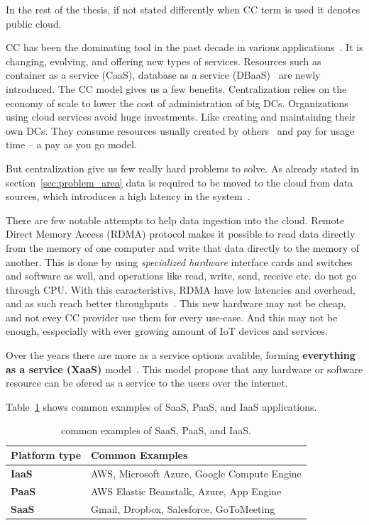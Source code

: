 In the rest of the thesis, if not stated differently when CC term is used it denotes public cloud.

CC has been the dominating tool in the past decade in various applications~\cite{Satyanarayanan17}. It is changing, evolving, and offering new types of services. Resources such as container as a service (CaaS), database as a service (DBaaS)~\cite{Peter} are newly introduced. The CC model gives us a few benefits. Centralization relies on the economy of scale to lower the cost of administration of big DCs. Organizations using cloud services avoid huge investments. Like creating and maintaining their own DCs. They consume resources usually created by others~\cite{Satyanarayanan17} and pay for usage time -- a pay as you go model. 

But centralization give us few really hard problems to solve. As already stated in section~\ref{sec:problem_area} data is required to be moved to the cloud from data sources, which introduces a high latency in the system~\cite{HossainRH18}. 

There are few notable attempts to help data ingestion into the cloud. Remote Direct Memory Access (RDMA) protocol makes it possible to read data directly from the memory of one computer and write that data directly to the memory of another. This is done by using \textit{specialized hardware} interface cards and switches and software as well, and operations like read, write, send, receive etc. do not go through CPU. With this caracteristivs, RDMA have low latencies and overhead, and as such reach better throughputs~\cite{CohenTKCKRCDG09}. This new hardware may not be cheap, and not evey CC provider use them for every use-case. And this may not be enough, esspecially with ever growing amount of IoT devices and services.

Over the years there are more as a service options avalible, forming \textbf{everything as a service (XaaS)} model~\cite{DuanFZSNH15}. This model propose that any hardware or software resource can be ofered as a service to the users over the internet.

Table~\ref{tab:table2} shows common examples of SaaS, PaaS, and IaaS applications.

\begin{table}[h!]
	\begin{center}
		\begin{tabular}{l|l}
			\textbf{Platform type} & \textbf{Common Examples}\\
			\hline
			\textbf{IaaS} & AWS, Microsoft Azure, Google Compute Engine \\
			\textbf{PaaS} & AWS Elastic Beanstalk, Azure, App Engine \\
			\textbf{SaaS} & Gmail, Dropbox, Salesforce, GoToMeeting \\
		\end{tabular}
	\end{center}
	\vspace{-0.5cm}
	\caption{common examples of SaaS, PaaS, and IaaS.}
	\label{tab:table2}
\end{table}

